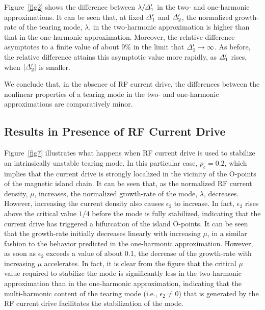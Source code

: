 \documentclass[12pt,prb,aps]{revtex4-1}
\begin{document}
Figure~\ref{fig2} shows the
difference between $\lambda/{\mit\Delta}_1'$ in the two- and one-harmonic approximations. It can be seen that, at fixed ${\mit\Delta}_1'$ and ${\mit\Delta}_2'$, the
normalized growth-rate of the tearing mode, $\lambda$,  in the two-harmonic approximation is higher than that in the one-harmonic
approximation. Moreover, the relative difference asymptotes to a finite value of about 9\% in the limit that 
${\mit\Delta}_1'\rightarrow \infty$. As before,  the relative difference attains this asymptotic value more rapidly, as ${\mit\Delta}_1'$ rises, 
when $|{\mit\Delta}_2'|$ is smaller. 

We conclude that, in the absence of RF current drive, the differences between the nonlinear properties
of a tearing mode in the two- and one-harmonic approximations are comparatively minor. 

\subsection{Results in Presence of RF Current Drive}
Figure~\ref{fig7} illustrates what happens when RF current drive is used to stabilize an intrinsically unstable tearing mode. In this particular case, $p_c=0.2$, which implies that the current drive is strongly localized in the vicinity of
the O-points of the magnetic island chain. It can be seen that, as the normalized RF current density, $\mu$, increases,
the normalized growth-rate of the mode, $\lambda$, decreases. However,  increasing the current
density also causes $\epsilon_2$ to increase. In fact, $\epsilon_2$ rises above the critical value $1/4$ before the
mode is fully stabilized, indicating that the current drive has triggered a  bifurcation of the island O-points. 
It can be seen that the growth-rate initially decreases linearly with increasing $\mu$, in a similar fashion to the behavior predicted in the one-harmonic approximation. However, as soon as $\epsilon_2$ exceeds a value of about 0.1, the
decrease of the growth-rate with increasing $\mu$ accelerates. In fact, it is clear from the figure that
the critical $\mu$ value required to stabilize the mode is significantly less in the two-harmonic approximation than in the
one-harmonic approximation, indicating that the multi-harmonic content of the tearing mode (i.e., $\epsilon_2\neq 0$) that is
generated by the RF current drive facilitates the stabilization of the mode. 
\end{document}

